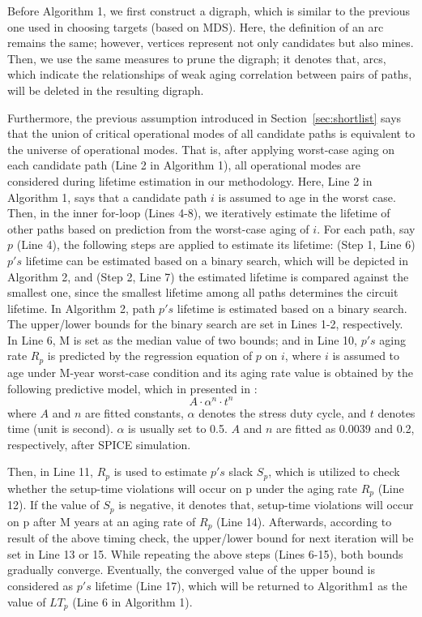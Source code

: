 Before Algorithm 1, we first construct a digraph, which is similar to the previous one used in choosing targets (based on MDS). Here, the definition of an arc remains the same; however, vertices represent not only candidates but also mines. Then, we use the same measures to prune the digraph; it denotes that, arcs, which indicate the relationships of weak aging correlation between pairs of paths, will be deleted in the resulting digraph.

Furthermore, the previous assumption introduced in Section~\ref{sec:shortlist} says that the union of critical operational modes of all candidate paths is equivalent to the universe of operational modes. That is, after applying worst-case aging on each candidate path (Line 2 in Algorithm 1), all operational modes are considered during lifetime estimation in our methodology. Here, Line 2 in Algorithm 1, says that a candidate path $i$ is assumed to age in the worst case. Then, in the inner for-loop (Lines 4-8), we iteratively estimate the lifetime of other paths based on prediction from the worst-case aging of $i$. For each path, say $p$ (Line 4), the following steps are applied to estimate its lifetime: (Step 1, Line 6) $p's$ lifetime can be estimated based on a binary search, which will be depicted in Algorithm 2, and (Step 2, Line 7) the estimated lifetime is compared against the smallest one, since the smallest lifetime among all paths determines the circuit lifetime.
In Algorithm 2, path $p's$ lifetime is estimated based on a binary search. The upper/lower bounds for the binary search are set in Lines 1-2, respectively. In Line 6, M is set as the median value of two bounds; and in Line 10, $p's$ aging rate $R_{p}$ is predicted by the regression equation of $p$ on $i$, where $i$ is assumed to age under M-year worst-case condition and its aging rate value is obtained by the following predictive model, which in presented in \cite{wang2007efficient}:
\begin{equation}
	A \cdot \alpha^n \cdot t^n 
\end{equation}
where $A$ and $n$ are fitted constants, $\alpha$ denotes the stress duty cycle, and $t$ denotes time (unit is second). $\alpha$ is usually set to 0.5. $A$ and $n$ are fitted as 0.0039 and 0.2, respectively, after SPICE simulation.

Then, in Line 11, $R_{p}$ is used to estimate $p's$ slack $S_{p}$, which is utilized to check whether the setup-time violations will occur on p under the aging rate $R_{p}$ (Line 12). If the value of $S_{p}$ is negative, it denotes that, setup-time violations will occur on p after M years at an aging rate of $R_{p}$ (Line 14). Afterwards, according to result of the above timing check, the upper/lower bound for next iteration will be set in Line 13 or 15. While repeating the above steps (Lines 6-15), both bounds gradually converge. Eventually, the converged value of the upper bound is considered as $p's$ lifetime (Line 17), which will be returned to Algorithm1 as the value of $LT_{p}$ (Line 6 in Algorithm 1).

